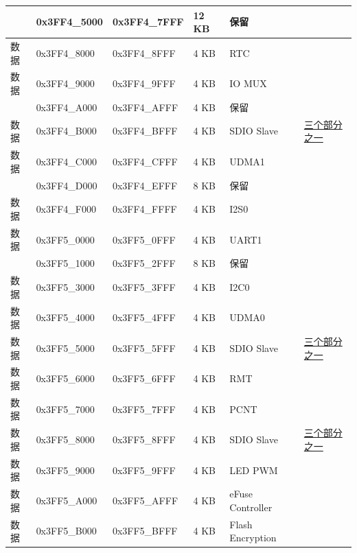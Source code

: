 \begin{longtable}[c]{ |p{1.5cm}|p{3cm}|p{3cm}|p{1.5cm}|p{3cm}|p{3cm}| }
    \rowcolor{gray!25}
    & 0x3FF4\_5000 & 0x3FF4\_7FFF & 12 KB & 保留 & \\
    
    \hline
    数据 & 0x3FF4\_8000 & 0x3FF4\_8FFF & 4 KB & RTC & \\
    \hline
    数据 & 0x3FF4\_9000 & 0x3FF4\_9FFF & 4 KB & IO MUX & \\
    \hline
    
    \rowcolor{gray!25}
    & 0x3FF4\_A000 & 0x3FF4\_AFFF & 4 KB & 保留 & \\
    
    \hline
    数据 & 0x3FF4\_B000 & 0x3FF4\_BFFF & 4 KB & SDIO Slave & \hyperlink{SDIO_Slave_split_three_part}{三个部分之一} \\
    \hline
    数据 & 0x3FF4\_C000 & 0x3FF4\_CFFF & 4 KB & UDMA1 & \\
    \hline
    
    \rowcolor{gray!25}
    & 0x3FF4\_D000 & 0x3FF4\_EFFF & 8 KB & 保留 & \\
    
    \hline
    数据 & 0x3FF4\_F000 & 0x3FF4\_FFFF & 4 KB & I2S0 & \\
    \hline
    数据 & 0x3FF5\_0000 & 0x3FF5\_0FFF & 4 KB & UART1 & \\
    \hline
    
    \rowcolor{gray!25}
    & 0x3FF5\_1000 & 0x3FF5\_2FFF & 8 KB & 保留 & \\
    
    \hline
    数据 & 0x3FF5\_3000 & 0x3FF5\_3FFF & 4 KB & I2C0 & \\
    \hline
    数据 & 0x3FF5\_4000 & 0x3FF5\_4FFF & 4 KB & UDMA0 & \\
    \hline
    数据 & 0x3FF5\_5000 & 0x3FF5\_5FFF & 4 KB & SDIO Slave & \hyperlink{SDIO_Slave_split_three_part}{三个部分之一} \\
    \hline
    数据 & 0x3FF5\_6000 & 0x3FF5\_6FFF & 4 KB & RMT & \\
    \hline
    数据 & 0x3FF5\_7000 & 0x3FF5\_7FFF & 4 KB & PCNT & \\
    \hline
    数据 & 0x3FF5\_8000 & 0x3FF5\_8FFF & 4 KB & SDIO Slave & \hyperlink{SDIO_Slave_split_three_part}{三个部分之一} \\
    \hline
    数据 & 0x3FF5\_9000 & 0x3FF5\_9FFF & 4 KB & LED PWM & \\
    \hline
    数据 & 0x3FF5\_A000 & 0x3FF5\_AFFF & 4 KB & eFuse Controller & \\
    \hline
    数据 & 0x3FF5\_B000 & 0x3FF5\_BFFF & 4 KB & Flash Encryption & \\
    \hline
    

\end{longtable}

